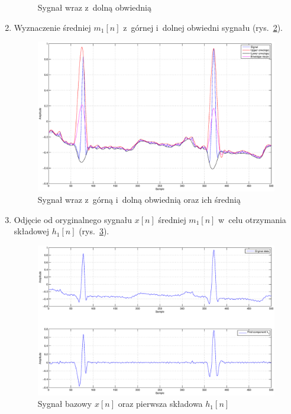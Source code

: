 \begin{enumerate}[1.]
\begin{figure}[!ht]
        \caption{Sygnał wraz z~dolną obwiednią}
        \label{fig:lowerenvelope}
    \end{figure}
    \item Wyznaczenie średniej $m_1[n]$ z~górnej i~dolnej obwiedni sygnału
    (rys.~\ref{fig:envelopemean}).
    \begin{figure}[!ht]
        \centering
        \includegraphics[width=\textwidth]{../img/envelopemean.eps}
        \caption{Sygnał wraz z~górną i~dolną obwiednią oraz ich średnią}
        \label{fig:envelopemean}
    \end{figure}
    \item Odjęcie od oryginalnego sygnału $x[n]$ średniej $m_1[n]$ w~celu
    otrzymania składowej $h_1[n]$ (rys.~\ref{fig:firstcomponent}).
    \begin{figure}[!ht]
        \centering
        \includegraphics[width=\textwidth]{../img/firstcomponent.eps}
        \caption{Sygnał bazowy $x[n]$ oraz pierwsza składowa $h_1[n]$}
        \label{fig:firstcomponent}

\end{figure}
\end{enumerate}
